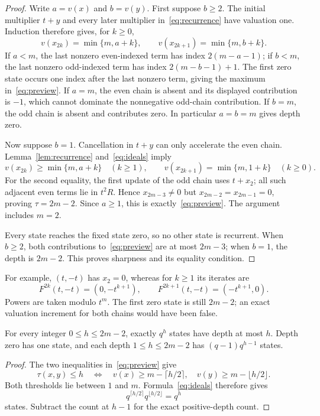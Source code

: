 \begin{proof}
Write $a=v(x)$ and $b=v(y)$. First suppose $b\geq2$. The initial
multiplier $t+y$ and every later multiplier in~\eqref{eq:recurrence}
have valuation one. Induction therefore gives, for $k\geq0$,
\begin{equation}
 v(x_{2k})=\min\{m,a+k\},\qquad
 v(x_{2k+1})=\min\{m,b+k\}.
 \label{eq:exactchains}
\end{equation}
If $a<m$, the last nonzero even-indexed term has index $2(m-a-1)$;
if $b<m$, the last nonzero odd-indexed term has index $2(m-b-1)+1$.
The first zero state occurs one index after the last nonzero term, giving
the maximum in~\eqref{eq:preview}. If $a=m$, the even chain is absent and
its displayed contribution is $-1$, which cannot dominate the nonnegative
odd-chain contribution. If $b=m$, the odd chain is absent and contributes
zero. In particular $a=b=m$ gives depth zero.

Now suppose $b=1$. Cancellation in $t+y$ can only accelerate the even
chain. Lemma~\ref{lem:recurrence} and~\eqref{eq:ideals} imply
\begin{equation}
 v(x_{2k})\geq\min\{m,a+k\}\quad(k\geq1),\qquad
 v(x_{2k+1})=\min\{m,1+k\}\quad(k\geq0).
 \label{eq:cancellationchains}
\end{equation}
For the second equality, the first update of the odd chain uses $t+x_2$;
all such adjacent even terms lie in $t^2R$. Hence $x_{2m-3}\ne0$ but
$x_{2m-2}=x_{2m-1}=0$, proving $\tau=2m-2$. Since $a\geq1$, this is
exactly~\eqref{eq:preview}. The argument includes $m=2$.

Every state reaches the fixed state zero, so no other state is recurrent.
When $b\geq2$, both contributions to~\eqref{eq:preview} are at most
$2m-3$; when $b=1$, the depth is $2m-2$. This proves sharpness and its
equality condition.
\end{proof}

For example, $(t,-t)$ has $x_2=0$, whereas for $k\geq1$ its iterates are
\begin{equation}
 F^{2k}(t,-t)=(0,-t^{k+1}),\qquad
 F^{2k+1}(t,-t)=(-t^{k+1},0).
 \label{eq:example}
\end{equation}
Powers are taken modulo $t^m$. The first zero state is still $2m-2$;
an exact valuation increment for both chains would have been false.

\begin{corollary}
\label{cor:depth}
For every integer $0\leq h\leq2m-2$, exactly $q^h$ states have depth at
most $h$. Depth zero has one state, and each depth $1\leq h\leq2m-2$ has
$(q-1)q^{h-1}$ states.
\end{corollary}

\begin{proof}
The two inequalities in~\eqref{eq:preview} give
\[
 \tau(x,y)\leq h\quad\Longleftrightarrow\quad
 v(x)\geq m-\lceil h/2\rceil,\quad
 v(y)\geq m-\lfloor h/2\rfloor.
\]
Both thresholds lie between $1$ and $m$. Formula~\eqref{eq:ideals}
therefore gives
\[
 q^{\lceil h/2\rceil}q^{\lfloor h/2\rfloor}=q^h
\]
states. Subtract the count at $h-1$ for the exact positive-depth count.
\end{proof}
